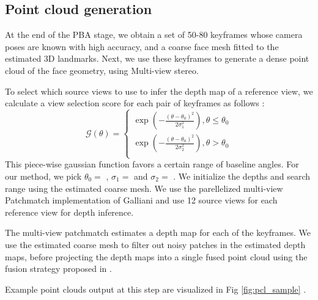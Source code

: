 \documentclass[10pt,twocolumn,letterpaper]{article}
\begin{document}
\subsection{Point cloud generation} \label{sec:pcl}

At the end of the PBA stage, we obtain a set of 50-80 keyframes whose camera poses are known with high accuracy, and a coarse face mesh fitted to the estimated 3D landmarks. Next, we use these keyframes to generate a dense point cloud of the face geometry, using Multi-view stereo.

To select which source views to use to infer the depth map of a reference view, we calculate a view selection score for each pair of keyframes as follows : 
\[ \mathcal{G}(\theta) =  \left\{
\begin{array}{ll}
      \exp(-\frac{(\theta - \theta_0)^2}{2\sigma_1^2}), \theta \leq \theta_0 \\
      \exp(-\frac{(\theta - \theta_0)^2}{2\sigma_2^2}), \theta > \theta_0 \\
\end{array} 
\right. \]
This piece-wise gaussian function favors a certain range of baseline angles. For our method, we pick $\theta_{0} = $  , $\sigma_{1} =$  and $\sigma_2=$  .
We initialize the depths and search range using the estimated coarse mesh. We use the parellelized multi-view Patchmatch implementation of Galliani \etal \cite{galliani2015massively} and use 12 source views for each reference view for depth inference.

The multi-view patchmatch estimates a depth map for each of the keyframes. We use the estimated coarse mesh to filter out noisy patches in the estimated depth maps, before projecting the depth maps into a single fused point cloud using the fusion strategy proposed in \cite{galliani2015massively}.

Example point clouds output at this step are visualized in Fig \ref{fig:pcl_sample} . 
\end{document}
